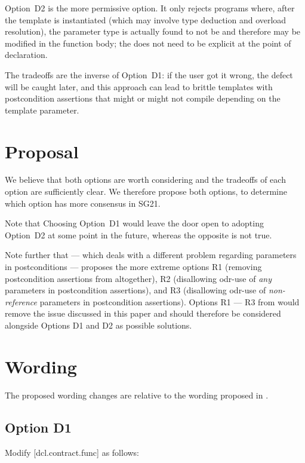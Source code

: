 Option~D2 is the more permissive option. It only rejects programs where, after the template is instantiated (which may involve type deduction and overload resolution), the parameter type is actually found to not be  and therefore may be modified in the function body; the  does not need to be explicit at the point of declaration. 

The tradeoffs are the inverse of Option~D1: if the user got it wrong, the defect will be caught later, and this approach can lead to brittle templates with postcondition assertions that might or might not compile depending on the template parameter.

\section{Proposal}

We believe that both options are worth considering and the tradeoffs of each option are sufficiently clear. We therefore propose both options, to determine which option has more consensus in SG21. 

Note that Choosing Option~D1 would leave the door open to adopting Option~D2 at some point in the future, whereas the opposite is not true.

Note further that \cite{D3487R0} --- which deals with a different problem regarding parameters in postconditions --- proposes the more extreme options R1 (removing postcondition assertions from \cite{P2900R10} altogether), R2 (disallowing odr-use of \emph{any} parameters in postcondition assertions), and R3 (disallowing odr-use of \emph{non-reference} parameters in postcondition assertions). Options R1 --- R3 from \cite{D3487R0} would remove the issue discussed in this paper and should therefore be considered alongside Options D1 and D2 as possible solutions.

\section{Wording}

The proposed wording changes are relative to the wording proposed in \cite{P2900R10}.

\subsection{Option D1}

Modify [dcl.contract.func] as follows:

